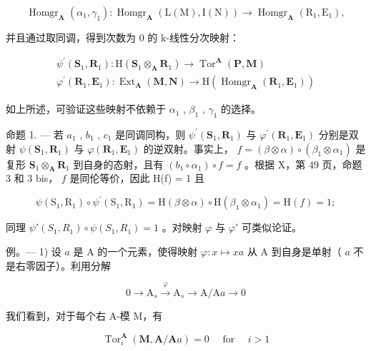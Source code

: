 \[
\operatorname{Homgr} _ {\mathbf {A}} \left(\alpha_ {1}, \gamma_ {1}\right): \operatorname{Homgr} _ {\mathbf {A}} \left(\mathrm{L} (\mathrm{M}), \mathrm{I} (\mathrm{N})\right)\rightarrow \operatorname{Homgr} _ {\mathbf {A}} \left(\mathrm{R} _ {1}, \mathrm{E} _ {1}\right),
\]

并且通过取同调，得到次数为 0 的 k-线性分次映射：

\[
\begin{array}{l} \psi^ {\prime} (\mathbf {S} _ {1}, \mathbf {R} _ {1}): \mathrm{H} (\mathbf {S} _ {1} \otimes_ {\mathbf {A}} \mathbf {R} _ {1}) \to \operatorname{Tor} ^ {\mathbf {A}} (\mathbf {P}, \mathbf {M}) \\ \varphi^ {\prime} (\mathbf {R} _ {1}, \mathbf {E} _ {1}): \operatorname{Ext} _ {\mathbf {A}} (\mathbf {M}, \mathbf {N}) \to \mathrm{H} (\operatorname{Homgr} _ {\mathbf {A}} (\mathbf {R} _ {1}, \mathbf {E} _ {1})) \end{array}
\]

如上所述，可验证这些映射不依赖于 \(\alpha_{1}\) , \(\beta_{1}\) , \(\gamma_{1}\) 的选择。

命题 1. --- 若 \(a_{1}\) , \(b_{1}\) , \(c_{1}\) 是同调同构，则 \(\psi^{\prime}(\mathbf{S}_{1},\mathbf{R}_{1})\) 与 \(\varphi^{\prime}(\mathbf{R}_{1},\mathbf{E}_{1})\) 分别是双射 \(\psi(\mathbf{S}_{1},\mathbf{R}_{1})\) 与 \(\varphi(\mathbf{R}_{1},\mathbf{E}_{1})\) 的逆双射。事实上， \(f = (\beta \otimes \alpha) \circ (\beta_{1} \otimes \alpha_{1})\) 是复形 \(\mathbf{S}_{1} \otimes_{\mathbf{A}} \mathbf{R}_{1}\) 到自身的态射，且有 \((b_{1} \circ \alpha_{1}) \circ f = f\) 。根据 X，第 49 页，命题 3 和 3 bis， \(f\) 是同伦等价，因此 H(f) = 1 且

\[
\psi \left(\mathrm{S} _ {1}, \mathrm{R} _ {1}\right) \circ \psi^ {\prime} \left(\mathrm{S} _ {1}, \mathrm{R} _ {1}\right) = \mathrm{H} (\beta \otimes \alpha) \circ \mathrm{H} \left(\beta_ {1} \otimes \alpha_ {1}\right) = \mathrm{H} (f) = 1;
\]

同理 \(\psi'(S_1, R_1) \circ \psi(S_1, R_1) = 1\) 。对映射 \(\varphi\) 与 \(\varphi'\) 可类似论证。

例。--- 1) 设 \(a\) 是 A 的一个元素，使得映射 \(\varphi : x \mapsto xa\) 从 A 到自身是单射（ \(a\) 不是右零因子）。利用分解

\[
0 \rightarrow \mathrm{A} _ {s} \xrightarrow {\varphi} \mathrm{A} _ {s} \rightarrow \mathrm{A} / \mathrm{A} a \rightarrow 0
\]

我们看到，对于每个右 A-模 M，有

\[
\operatorname{Tor} _ {i} ^ {\mathbf {A}} (\mathbf {M}, \mathbf {A} / \mathbf {A} a) = 0 \quad \text { for } \quad i > 1
\]

